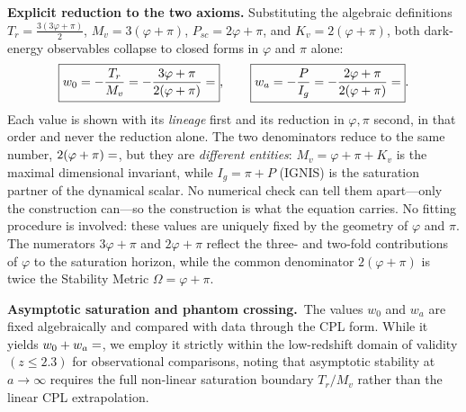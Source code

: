 \documentclass[12pt,a4paper]{article}
\begin{document}
\noindent\textbf{Explicit reduction to the two axioms.}
Substituting the algebraic definitions
$T_r = \tfrac{3(3\varphi+\pi)}{2}$,
$M_v = 3(\varphi+\pi)$,
$P_{sc} = 2\varphi+\pi$, and
$K_v = 2(\varphi+\pi)$, both
dark-energy observables collapse to closed forms in $\varphi$ and $\pi$ alone:
\begin{equation}
  \boxed{w_0 = -\frac{T_r}{M_v} = -\frac{3\varphi+\pi}{2(\varphi+\pi)} = \val{W0_d6}},
  \qquad
  \boxed{w_a = -\frac{P}{I_g} = -\frac{2\varphi+\pi}{2(\varphi+\pi)} = \val{WA_d6}}.
  \label{eq:w0wa_explicit}
\end{equation}
Each value is shown with its \emph{lineage} first and its reduction in
$\varphi,\pi$ second, in that order and never the reduction alone. The two
denominators reduce to the same number, $2(\varphi+\pi)=\val{K_V_d6}$, but they are
\emph{different entities}: $M_v=\varphi+\pi+K_v$ is the maximal dimensional
invariant, while $I_g=\pi+P$ (IGNIS) is the saturation partner of the dynamical
scalar. No numerical check can tell them apart---only the construction can---so
the construction is what the equation carries.
No fitting procedure is involved: these values are uniquely fixed by the geometry of $\varphi$ and $\pi$.
The numerators $3\varphi+\pi$ and $2\varphi+\pi$ reflect the three- and two-fold
contributions of $\varphi$ to the saturation horizon, while the common denominator
$2(\varphi+\pi)$ is twice the Stability Metric $\Omega=\varphi+\pi$.

\medskip
\noindent\textbf{Asymptotic saturation and phantom crossing.}\ The values $w_0$ and $w_a$ are fixed algebraically and compared with data through the CPL form. While it yields $w_0+w_a=\val{w0_mas_wa}$, we employ it strictly within the low-redshift domain of validity $(z \le 2.3)$ for observational comparisons, noting that asymptotic stability at $a \to \infty$ requires the full non-linear saturation boundary $T_r/M_v$ rather than the linear CPL extrapolation.
\end{document}
